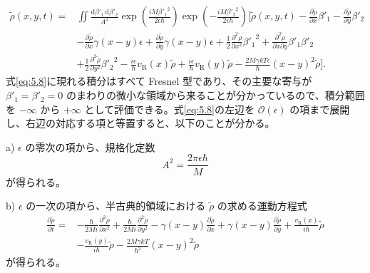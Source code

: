 \begin{equation}
\begin{aligned}
\tilde\rho(x,y,t)={}&\iint\frac{\mathrm d\beta'_1\,\mathrm d\beta'_2}{A^2}
\exp\!\left(\frac{iM{\beta'_1}^2}{2\epsilon\hbar}\right)
\exp\!\left(-\frac{iM{\beta'_2}^2}{2\epsilon\hbar}\right)
\Bigg[\tilde\rho(x,y,t)
-\frac{\partial\tilde\rho}{\partial x}\beta'_1
-\frac{\partial\tilde\rho}{\partial y}\beta'_2\\
&-\frac{\partial\tilde\rho}{\partial x}\gamma(x-y)\epsilon
+\frac{\partial\tilde\rho}{\partial y}\gamma(x-y)\epsilon
+\frac12\frac{\partial^2\tilde\rho}{\partial x^2}{\beta'_1}^2
+\frac{\partial^2\tilde\rho}{\partial x\partial y}\beta'_1\beta'_2\\
&+\frac12\frac{\partial^2\tilde\rho}{\partial y^2}{\beta'_2}^2
-\frac{i\epsilon}{\hbar}v_{\mathrm R}(x)\tilde\rho
+\frac{i\epsilon}{\hbar}v_{\mathrm R}(y)\tilde\rho
-\frac{2M\gamma kT\epsilon}{\hbar}(x-y)^2\tilde\rho\Bigg].
\end{aligned}
\tag{5.8}\label{eq:5.8}
\end{equation}
式\eqref{eq:5.8}に現れる積分はすべて Fresnel 型であり、その主要な寄与が $\beta'_1=\beta'_2=0$ のまわりの微小な領域から来ることが分かっているので、積分範囲を $-\infty$ から $+\infty$ として評価できる。式\eqref{eq:5.8}の左辺を $\mathcal O(\epsilon)$ の項まで展開し、右辺の対応する項と等置すると、以下のことが分かる。

a) $\epsilon$ の零次の項から、規格化定数
\begin{equation}
A^2=\frac{2\pi\epsilon\hbar}{M}
\tag{5.9}\label{eq:5.9}
\end{equation}
が得られる。

b) $\epsilon$ の一次の項から、半古典的領域における $\tilde\rho$ の求める運動方程式
\begin{equation}
\begin{aligned}
\frac{\partial\tilde\rho}{\partial t}={}&
-\frac{\hbar}{2Mi}\frac{\partial^2\tilde\rho}{\partial x^2}
+\frac{\hbar}{2Mi}\frac{\partial^2\tilde\rho}{\partial y^2}
-\gamma(x-y)\frac{\partial\tilde\rho}{\partial x}
+\gamma(x-y)\frac{\partial\tilde\rho}{\partial y}
+\frac{v_{\mathrm R}(x)}{i\hbar}\tilde\rho\\
&-\frac{v_{\mathrm R}(y)}{i\hbar}\tilde\rho
-\frac{2M\gamma kT}{\hbar^2}(x-y)^2\tilde\rho
\end{aligned}
\tag{5.10}\label{eq:5.10}
\end{equation}
が得られる。

